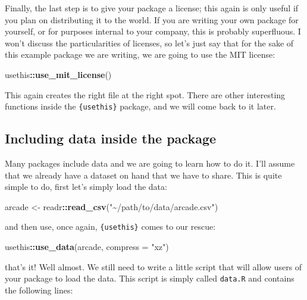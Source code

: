 \documentclass[
]{article}
\newenvironment{Shaded}{\begin{snugshade}}{\end{snugshade}}
\newcommand{\DataTypeTok}[1]{\textcolor[rgb]{0.13,0.29,0.53}{#1}}
\newcommand{\KeywordTok}[1]{\textcolor[rgb]{0.13,0.29,0.53}{\textbf{#1}}}
\newcommand{\NormalTok}[1]{#1}
\newcommand{\OperatorTok}[1]{\textcolor[rgb]{0.81,0.36,0.00}{\textbf{#1}}}
\newcommand{\StringTok}[1]{\textcolor[rgb]{0.31,0.60,0.02}{#1}}
\begin{document}
Finally, the last step is to give your package a license; this again is only useful if you plan on
distributing it to the world. If you are writing your own package for yourself, or for purposes
internal to your company, this is probably superfluous. I won't discuss the particularities of
licenses, so let's just say that for the sake of this example package we are writing, we are going
to use the MIT license:

\begin{Shaded}
\begin{Highlighting}[]
\NormalTok{usethis}\OperatorTok{::}\KeywordTok{use\_mit\_license}\NormalTok{()}
\end{Highlighting}
\end{Shaded}

This again creates the right file at the right spot. There are other interesting functions inside
the \texttt{\{usethis\}} package, and we will come back to it later.

\hypertarget{including-data-inside-the-package}{%
\subsection{Including data inside the package}\label{including-data-inside-the-package}}

Many packages include data and we are going to learn how to do it. I'll assume that we already
have a dataset on hand that we have to share. This is quite simple to do, first let's simply
load the data:

\begin{Shaded}
\begin{Highlighting}[]
\NormalTok{arcade \textless{}{-}}\StringTok{ }\NormalTok{readr}\OperatorTok{::}\KeywordTok{read\_csv}\NormalTok{(}\StringTok{"\textasciitilde{}/path/to/data/arcade.csv"}\NormalTok{)}
\end{Highlighting}
\end{Shaded}

and then use, once again, \texttt{\{usethis\}} comes to our rescue:

\begin{Shaded}
\begin{Highlighting}[]
\NormalTok{usethis}\OperatorTok{::}\KeywordTok{use\_data}\NormalTok{(arcade, }\DataTypeTok{compress =} \StringTok{"xz"}\NormalTok{)}
\end{Highlighting}
\end{Shaded}

that's it! Well almost. We still need to write a little script that will allow users of your
package to load the data. This script is simply called \texttt{data.R} and contains the following lines:
\end{document}
